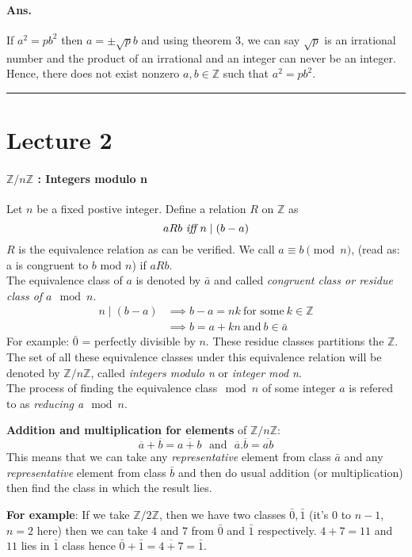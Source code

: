 \documentclass[12pt]{report}
\begin{document}
\paragraph*{Ans.}If $a^2 = pb^2$ then $a = \pm \sqrt{p}b$ and using theorem 3, we can say $\sqrt{p}$ is an irrational number and the product of an irrational and an integer can never be an integer. Hence, there does not exist nonzero $a,b \in \mathbb{Z}$ such that $a^2 = pb^2$.
\hrule
\section*{Lecture 2}
\paragraph*{\textbf{$\mathbb{Z}/n \mathbb{Z}$} : Integers modulo n} Let $n$ be a fixed postive integer. Define a relation $R$ on $\mathbb{Z}$ as 
$$ aRb ~\text{{\em iff}}~ n \mid (b-a)$$ $R$ is the equivalence relation as can be verified. We call $a \equiv b \pmod n$, (read as: a is congruent to $b$ mod $n$) if $aRb$. \\
The equivalence class of $a$ is denoted by $\bar{a}$ and called {\em congruent class or residue class of $a \mod n$}.
\begin{align*}
    n\mid (b-a) &\implies b-a = nk~\text{for some}~k \in \mathbb{Z}\\
    &\implies b = a + kn ~\text{and}~ b \in \bar{a}
\end{align*}
For example: $\bar{0}$ = perfectly divisible by $n$. These residue classes partitions the $\mathbb{Z}$.\\
The set of all these equivalence classes under this equivalence relation will be denoted by $\mathbb{Z}/n\mathbb{Z}$, called {\em integers modulo n} or {\em integer mod n}.\\
The process of finding the equivalence class$\mod n$ of some integer $a$ is refered to as {\em reducing a$\mod n$}.

\textbf{Addition and multiplication for elements} of $\mathbb{Z}/n\mathbb{Z}$:
$$ \overline{a} + \overline{b} = \overline{a+b}~~~\text{and}~~~ \overline{a} . \overline{b} = \overline{ab}$$
This means that we can take any {\em representative} element from class $\bar{a}$ and any {\em representative} element from class $\bar{b}$ and then do usual addition (or multiplication) then find the class in which the result lies.

\textbf{For example}: If we take $\mathbb{Z}/2\mathbb{Z}$, then we have two classes $\bar{0}, \bar{1}$ (it's $0$ to $n-1$, $n=2$ here) then we can take $4$ and $7$ from $\bar{0}$ and $\bar{1}$ respectively. $4+7 = 11$ and $11$ lies in $\bar{1}$ class hence $\bar{0} + \bar{1} = \overline{4+7} = \bar{1}$.
\end{document}
